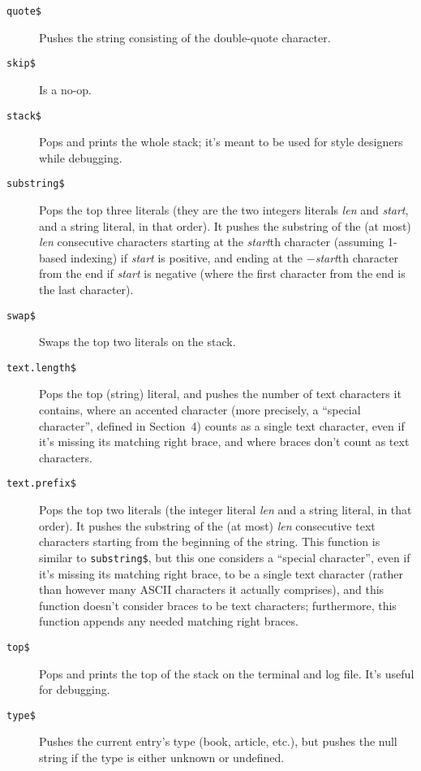 \begin{description}
\item[\hbox{\tt quote\$}\hfill]
Pushes the string consisting of the double-quote character.

\item[\hbox{\tt skip\$}\hfill]
Is a no-op.

\item[\hbox{\tt stack\$}\hfill]
Pops and prints the whole stack;
it's meant to be used for style designers while debugging.

\item[\hbox{\tt substring\$}\hfill]
Pops the top three literals
(they are the two integers literals {\it len\/} and {\it start}, and a
string literal, in that order).
It pushes the substring of the (at most) {\it len\/} consecutive characters
starting at the {\it start\/}th character (assuming 1-based indexing)
if {\it start\/} is positive, and ending at the $-${\it start\/}th character
from the end if {\it start\/} is negative
(where the first character from the end is the last character).

\item[\hbox{\tt swap\$}\hfill]
Swaps the top two literals on the stack.

\item[\hbox{\tt text.length\$}\hfill]
Pops the top (string) literal,
and pushes the number of text characters it contains, where an
accented character (more precisely, a ``special character''$\!$,
defined in Section~4)
counts as a single text character, even if it's missing
its matching right brace, and where braces don't count as
text characters.

\item[\hbox{\tt text.prefix\$}\hfill]
Pops the top two literals
(the integer literal {\it len\/} and a string literal, in that order).
It pushes the substring of the (at most) {\it len\/} consecutive text
characters starting from the beginning of the string.  This function
is similar to \hbox{\tt substring\$}, but this one considers
a ``special character''$\!$, even if
it's missing its matching right brace, to be a single text character
(rather than however many ASCII characters it actually comprises),
and this function doesn't consider braces to be text characters;
furthermore, this function appends any needed matching right braces.

\item[\hbox{\tt top\$}\hfill]
Pops and prints the top of the stack on the terminal and log file.
It's useful for debugging.

\item[\hbox{\tt type\$}\hfill]
Pushes the current entry's type (book, article, etc.),
but pushes the null string
if the type is either unknown or undefined.


\end{description}
